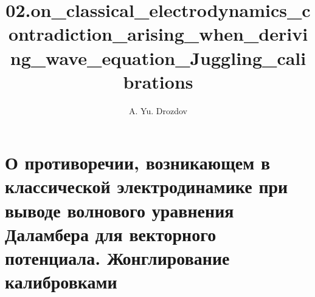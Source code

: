 \documentclass[11pt]{article}
\author{A. Yu. Drozdov}
\title{02.on\_classical\_electrodynamics\_contradiction\_arising\_when\_deriving\_wave\_equation\_Juggling\_calibrations}
\begin{document}
    
    \maketitle
    
    

    
    \section{О противоречии, возникающем в классической электродинамике при
выводе волнового уравнения Даламбера для векторного потенциала.
Жонглирование
калибровками}\label{ux43e-ux43fux440ux43eux442ux438ux432ux43eux440ux435ux447ux438ux438-ux432ux43eux437ux43dux438ux43aux430ux44eux449ux435ux43c-ux432-ux43aux43bux430ux441ux441ux438ux447ux435ux441ux43aux43eux439-ux44dux43bux435ux43aux442ux440ux43eux434ux438ux43dux430ux43cux438ux43aux435-ux43fux440ux438-ux432ux44bux432ux43eux434ux435-ux432ux43eux43bux43dux43eux432ux43eux433ux43e-ux443ux440ux430ux432ux43dux435ux43dux438ux44f-ux434ux430ux43bux430ux43cux431ux435ux440ux430-ux434ux43bux44f-ux432ux435ux43aux442ux43eux440ux43dux43eux433ux43e-ux43fux43eux442ux435ux43dux446ux438ux430ux43bux430.-ux436ux43eux43dux433ux43bux438ux440ux43eux432ux430ux43dux438ux435-ux43aux430ux43bux438ux431ux440ux43eux432ux43aux430ux43cux438}
\end{document}
